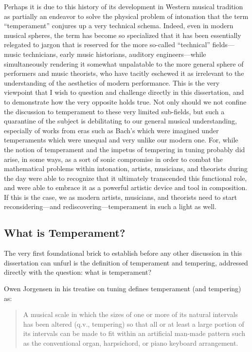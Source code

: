 Perhaps it is due to this history of its development in Western musical
tradition as partially an endeavor to solve the physical problem of
intonation that the term ``temperament'' conjures up a very technical
schema. Indeed, even in modern musical spheres, the term has become so
specialized that it has been essentially relegated to jargon that is
reserved for the more so-called ``technical'' fields---music
technicians, early music historians, auditory engineers---while
simultaneously rendering it somewhat unpalatable to the more general
sphere of performers and music theorists, who have tacitly eschewed it
as irrelevant to the understanding of the aesthetics of modern
performance. This is the very viewpoint that I wish to question and
challenge directly in this dissertation, and to demonstrate how the very
opposite holds true. Not only should we not confine the discussion to
temperament to these very limited sub-fields, but such a quarantine of
the subject is debilitating to our general musical understanding,
especially of works from eras such as Bach's which were imagined under
temperaments which were unequal and very unlike our modern one. For,
while the notion of temperament and the impetus of tempering in tuning
probably did arise, in some ways, as a sort of sonic compromise in order
to combat the mathematical problems within intonation, artists,
musicians, and theorists during the day were able to recognize that it
ultimately transcended this functional role, and were able to embrace it
as a powerful artistic device and tool in composition. If this is the
case, we as modern artists, musicians, and theorists need to start
reconsidering---and rediscovering---temperament in such a light as well.

\subsection{What is Temperament?}\label{what-is-temperament}

The very first foundational brick to establish before any other
discussion in this dissertation can unfurl is the definition of
temperament and tempering, addressed directly with the question: what is
temperament?

Owen Jorgensen in his treatise on tuning defines temperament (and
tempering) as:

\begin{quote}
A musical scale in which the sizes of one or more of its natural
intervals has been altered (q.v., tempering) so that all or at least a
large portion of its intervals can be made to fit within an artificial
man-made pattern such as the conventional organ, harpsichord, or piano
keyboard arrangement.
\end{quote}

